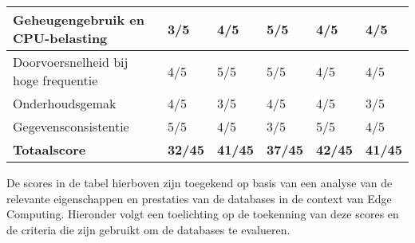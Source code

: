 \begin{table}[H]
{\begin{tabular}{|l|l|l|l|l|l|}
        Geheugengebruik en CPU-belasting     & 3/5                 & 4/5                & 5/5            & 4/5                  & 4/5              \\ \hline
        Doorvoersnelheid bij hoge frequentie & 4/5                 & 5/5                & 5/5            & 4/5                  & 4/5              \\ \hline
        Onderhoudsgemak                      & 4/5                 & 3/5                & 4/5            & 4/5                  & 3/5              \\ \hline
        Gegevensconsistentie                 & 5/5                 & 4/5                & 3/5            & 5/5                  & 4/5              \\ \hline
        \textbf{Totaalscore}         & \textbf{32/45}      & \textbf{41/45}     & \textbf{37/45} & \textbf{42/45}       & \textbf{41/45}   \\ \hline
        \end{tabular}%
        }
    \end{table}

    De scores in de tabel hierboven zijn toegekend op basis van een analyse van de relevante eigenschappen en prestaties van de databases in de context van Edge Computing. Hieronder volgt een toelichting op de toekenning van deze scores en de criteria die zijn gebruikt om de databases te evalueren.




